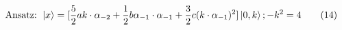 \begin{equation}
\text{Ansatz: }\left| x\right\rangle =[\frac{5}{2}ak\cdot \alpha _{-2}+\frac{%
1}{2}b\alpha _{-1}\cdot \alpha _{-1}+\frac{3}{2}c(k\cdot \alpha
_{-1})^{2}]\left| 0,k\right\rangle ;-k^{2}=4  \tag{14}
\end{equation}%
